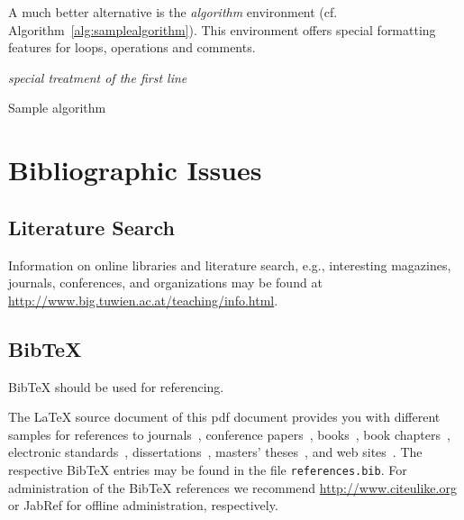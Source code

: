 \documentclass{llncs}
\begin{document}
A much better alternative is the \textit{algorithm} environment (cf. Algorithm~\ref{alg:samplealgorithm}). This environment offers special formatting features for loops, operations and comments.

\begin{algorithm}[t]


\BlankLine

\emph{special treatment of the first line}\;
\caption{Sample algorithm}\label{alg:samplealgorithm}
\end{algorithm}

\section{Bibliographic Issues}

\subsection{Literature Search}

Information on online libraries and literature search, e.g., interesting magazines, journals, conferences, and organizations may be found at \url{http://www.big.tuwien.ac.at/teaching/info.html}.

\subsection{BibTeX}

BibTeX should be used for referencing.

The LaTeX source document of this pdf document provides you with different samples for references to journals~\cite{jour:B2BServices}, conference papers~\cite{proc:TheWebMLApproach}, books~\cite{book:umlatwork}, book chapters~\cite{incoll:ErhardKonrad1992}, electronic standards~\cite{man:BPEL}, dissertations~\cite{phdthesis:manuelWimmer}, masters' theses~\cite{mast:AUMLProfile}, and web sites~\cite{misc:BIGWebsite}. The respective BibTeX entries may be found in the file \texttt{references.bib}. For administration of the BibTeX references we recommend \url{http://www.citeulike.org} or JabRef for offline administration, respectively.



\end{document}
